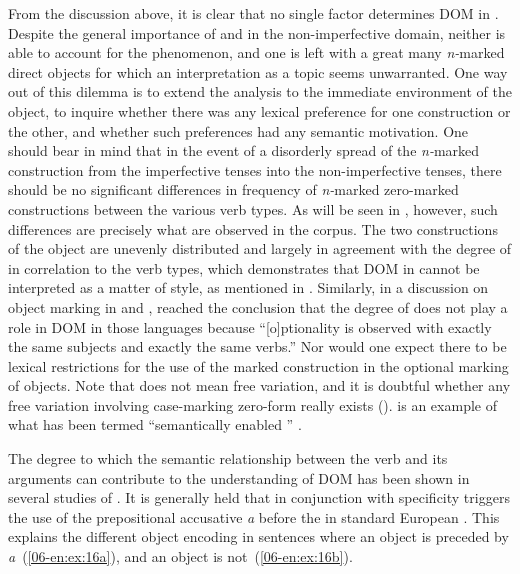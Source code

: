 \documentclass[output=paper]{LSP/langsci}
\begin{document}
From the discussion above, it is clear that no single factor determines DOM in . Despite the general importance of  and  in the non-imperfective domain, neither is able to account for the phenomenon, and one is left with a great many \textit{n-}marked direct objects for which an interpretation as a topic seems unwarranted. One way out of this dilemma is to extend the analysis to the immediate environment of the object, to inquire whether there was any lexical preference for one construction or the other, and whether such preferences had any semantic motivation. One should bear in mind that in the event of a disorderly spread of the \textit{n-}marked construction from the imperfective tenses into the non-imperfective tenses, there should be no significant differences in frequency of \textit{n-}marked \vs zero-marked constructions between the various verb types. As will be seen in , however, such differences are precisely what are observed in the corpus. The two constructions of the object are unevenly distributed and largely in agreement with the degree of  in correlation to the verb types, which demonstrates that DOM in  cannot be interpreted as a matter of style, as mentioned in . Similarly, in a discussion on object marking in  and , \citet[13]{Dalrympleetal2011Objects} reached the conclusion that the degree of  does not play a role in DOM in those languages because “[o]ptionality is observed with exactly the same subjects and exactly the same verbs.” Nor would one expect there to be lexical restrictions for the use of the marked construction in the optional marking of objects. Note that  does not mean free variation, and it is doubtful whether any free variation involving case-marking \vs zero-form really exists (\cf \citealt[1615]{McGregor2010Optional}).  is an example of what has been termed “semantically enabled ” \citep[505]{Kittila2005Optional}.

\largerpage
The degree to which the semantic relationship between the verb and its arguments can contribute to the understanding of DOM has been shown in several studies of . It is generally held that  in conjunction with specificity triggers the use of the prepositional accusative \textit{a} before the  in standard European . This explains the different object encoding in  sentences where an   object is preceded by \textit{a}~(\ref{06-en:ex:16a}), and an   object is not~(\ref{06-en:ex:16b}).
\end{document}
